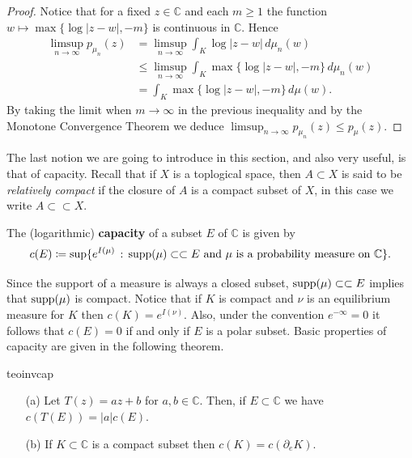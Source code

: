 \begin{proof}
Notice that for a fixed $z\in \mathbb{C}$  and each $m\geq 1$ the function $w\mapsto \max\{\log|z-w|,-m\}$ is continuous in $\mathbb{C}$. Hence
\begin{align*}
\limsup_{n\rightarrow \infty} p_{\mu_n}(z) &= \limsup_{n\rightarrow \infty} \int_K \log|z-w| \,d\mu_n(w)\\
&\leq \limsup_{n\rightarrow \infty} \int_K \max\{\log|z-w|,-m\} \,d\mu_n(w)\\
&= \int_K \max\{\log|z-w|,-m\} \,d\mu(w).
\end{align*}
By taking the limit when $m\rightarrow \infty$ in the previous inequality and by the Monotone Convergence Theorem we deduce $\limsup_{n\rightarrow \infty} p_{\mu_n}(z) \leq p_{\mu}(z).$
\end{proof}

The last notion we are going to introduce in this section, and also very useful, is that of capacity. Recall that if $X$ is a toplogical space, then $A\subset X$ is said to be {\it relatively compact} if the closure of $A$ is a compact subset of $X$, in this case we write $A\subset\subset X$.

\begin{mydef}{}{}
The (logarithmic) {\bf capacity} of a subset $E$ of $\mathbb{C}$ is given by
$$c(E) \coloneqq \sup \{e^{I(\mu)}\,:\, \text{supp}(\mu)\subset \subset E \text{ and } \mu \text{ is a probability measure on } \mathbb{C}\}.$$ 
\end{mydef}

Since the support of a measure is always a closed subset, $\text{supp}(\mu)\subset \subset E$ implies that $\text{supp}(\mu)$ is compact. Notice that if $K$ is compact and $\nu$ is an equilibrium measure for $K$ then $c(K) = e^{I(\nu)}$. Also, under the convention $e^{-\infty}=0$ it follows that $c(E)=0$ if and only if $E$ is a polar subset. Basic properties of capacity are given in the following theorem.\\

\begin{mytheo}{}{teoinvcap}
\begin{enumerate}
\item[(a)] Let $T(z)=az+b$ for $a,b\in \mathbb{C}$. Then, if $E\subset \mathbb{C}$ we have $c(T(E)) = |a|c(E)$.\\
\item[(b)] If $K\subset \mathbb{C}$ is a compact subset then $c(K) = c(\partial_e K)$.\\
\end{enumerate}
\end{mytheo}

